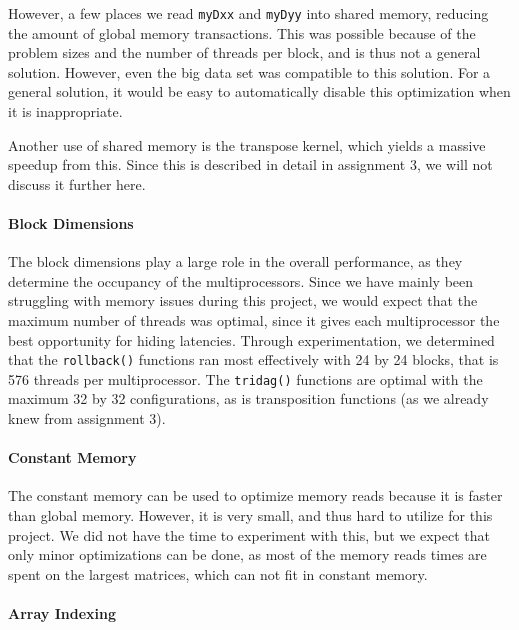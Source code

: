 \documentclass[11pt]{article}
\begin{document}
However, a few places we read \texttt{myDxx} and \texttt{myDyy} into shared memory, reducing the amount of global memory transactions.
This was possible because of the problem sizes and the number of threads per block, and is thus not a general solution.
However, even the big data set was compatible to this solution.
For a general solution, it would be easy to automatically disable this optimization when it is inappropriate.

Another use of shared memory is the transpose kernel, which yields a massive speedup from this.
Since this is described in detail in assignment 3, we will not discuss it further here.

\paragraph{Block Dimensions\\}

The block dimensions play a large role in the overall performance, as they determine the occupancy of the multiprocessors.
Since we have mainly been struggling with memory issues during this project, we would expect that the maximum number of threads was optimal, since it gives each multiprocessor the best opportunity for hiding latencies.
Through experimentation, we determined that the \texttt{rollback()} functions ran most effectively with 24 by 24 blocks, that is 576 threads per multiprocessor.
The \texttt{tridag()} functions are optimal with the maximum 32 by 32 configurations, as is transposition functions (as we already knew from assignment 3).

\paragraph{Constant Memory\\}

The constant memory can be used to optimize memory reads because it is faster than global memory.
However, it is very small, and thus hard to utilize for this project.
We did not have the time to experiment with this, but we expect that only minor optimizations can be done, as most of the memory reads times are spent on the largest matrices, which can not fit in constant memory.

\paragraph{Array Indexing\\}
\end{document}
